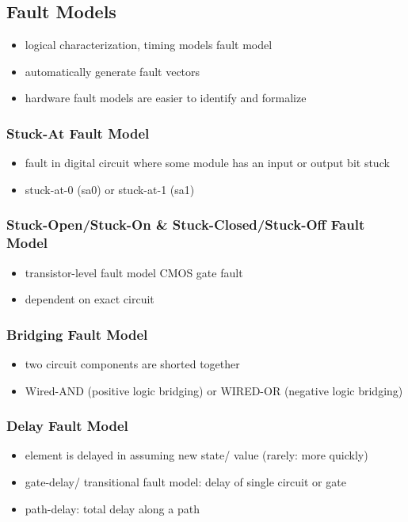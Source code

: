 \documentclass[a4paper, 10pt]{article}
\begin{document}
\subsection*{Fault Models}
\begin{itemize}
    \item logical characterization, timing models \follows fault model
    \item automatically generate fault vectors
    \item hardware fault models are easier to identify and formalize
\end{itemize}

\subsubsection*{Stuck-At Fault Model}
\begin{itemize}
    \item fault in digital circuit where some module has an input or output bit stuck
    \item stuck-at-0 (sa0) or stuck-at-1 (sa1)
\end{itemize}

\subsubsection*{Stuck-Open/Stuck-On \& Stuck-Closed/Stuck-Off Fault Model}
\begin{itemize}
    \item transistor-level fault model \follows CMOS gate fault
    \item dependent on exact circuit
\end{itemize}

\subsubsection*{Bridging Fault Model}
\begin{itemize}
    \item two circuit components are shorted together
    \item Wired-AND (positive logic bridging) or WIRED-OR (negative logic bridging)
\end{itemize}

\subsubsection*{Delay Fault Model}
\begin{itemize}
    \item element is delayed in assuming new state/ value (rarely: more quickly)
    \item gate-delay/ transitional fault model: delay of single circuit or gate
    \item path-delay: total delay along a path
\end{itemize}
\end{document}
